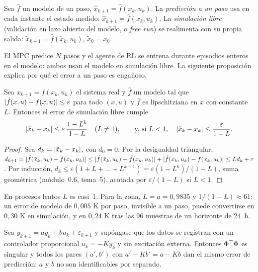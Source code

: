 \begin{definicion}\label{def:validacion}
Sea $\hat f$ un modelo de un paso, $\hat x_{k+1}=\hat f(x_k,u_k)$. La \emph{predicción a un paso} usa en cada instante el estado medido: $\hat x_{k+1}=\hat f(x_k,u_k)$. La \emph{simulación libre} (validación en lazo abierto del modelo, o \emph{free run}) se realimenta con su propia salida: $\tilde x_{k+1}=\hat f(\tilde x_k,u_k)$, $\tilde x_0=x_0$.
\end{definicion}

El MPC predice $N$ pasos y el agente de RL se entrena durante episodios enteros en el modelo: ambos usan el modelo en simulación libre. La siguiente proposición explica por qué el error a un paso es engañoso.

\begin{proposicion}\label{prop:acumula}
Sea $x_{k+1}=f(x_k,u_k)$ el sistema real y $\hat f$ un modelo tal que $\lvert\hat f(x,u)-f(x,u)\rvert\le\varepsilon$ para todo $(x,u)$ y $\hat f$ es lipschitziana en $x$ con constante $L$. Entonces el error de simulación libre cumple
\[
\lvert\tilde x_k-x_k\rvert\le\varepsilon\,\frac{1-L^{k}}{1-L}\quad(L\ne1),\qquad\text{y, si }L<1,\quad \lvert\tilde x_k-x_k\rvert\le\frac{\varepsilon}{1-L}.
\]
\end{proposicion}

\begin{proof}
Sea $d_k=\lvert\tilde x_k-x_k\rvert$, con $d_0=0$. Por la desigualdad triangular,
$d_{k+1}=\lvert\hat f(\tilde x_k,u_k)-f(x_k,u_k)\rvert\le\lvert\hat f(\tilde x_k,u_k)-\hat f(x_k,u_k)\rvert+\lvert\hat f(x_k,u_k)-f(x_k,u_k)\rvert\le Ld_k+\varepsilon$.
Por inducción, $d_k\le\varepsilon(1+L+\dots+L^{k-1})=\varepsilon(1-L^{k})/(1-L)$, suma geométrica (módulo~0.6, tema~5), acotada por $\varepsilon/(1-L)$ si $L<1$.
\end{proof}

En procesos lentos $L$ es casi~1. Para la zona, $L=a=0{,}9835$ y $1/(1-L)\approx61$: un error de modelo de $0{,}005$ K por paso, invisible a un paso, puede convertirse en $0{,}30$ K en simulación, y en $0{,}24$ K tras las 96 muestras de un horizonte de 24~h.

\begin{proposicion}\label{prop:lazo}
Sea $y_{k+1}=ay_k+bu_k+\varepsilon_{k+1}$ y supóngase que los datos se registran con un controlador proporcional $u_k=-Ky_k$ y sin excitación externa. Entonces $\Phi^{\top}\Phi$ es singular y todos los pares $(a',b')$ con $a'-Kb'=a-Kb$ dan el mismo error de predicción: $a$ y $b$ no son identificables por separado.
\end{proposicion}

